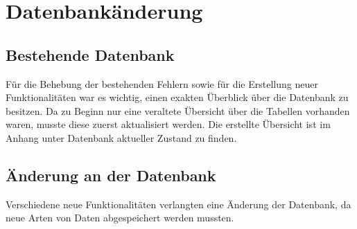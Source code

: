 

\section{Datenbankänderung}

\subsection{Bestehende Datenbank}

Für die Behebung der bestehenden Fehlern sowie für die Erstellung neuer Funktionalitäten war es wichtig, einen exakten Überblick über die Datenbank zu besitzen. Da zu Beginn nur eine veraltete Übersicht über die Tabellen vorhanden waren, musste diese zuerst aktualisiert werden. Die erstellte Übersicht ist im Anhang unter \glqq Datenbank aktueller Zustand \grqq zu finden.



\subsection{Änderung an der Datenbank}
\label{subsec:DBAenderungen}
Verschiedene neue Funktionalitäten verlangten eine Änderung der Datenbank, da neue Arten von Daten abgespeichert werden mussten.


